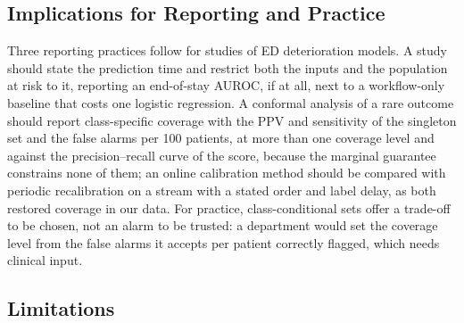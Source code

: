 \subsection{Implications for Reporting and Practice}

Three reporting practices follow for studies of ED deterioration models. A study should state the prediction time and restrict both the inputs and the population at risk to it, reporting an end-of-stay AUROC, if at all, next to a workflow-only baseline that costs one logistic regression. A conformal analysis of a rare outcome should report class-specific coverage with the PPV and sensitivity of the singleton set and the false alarms per 100 patients, at more than one coverage level and against the precision--recall curve of the score, because the marginal guarantee constrains none of them; an online calibration method should be compared with periodic recalibration on a stream with a stated order and label delay, as both restored coverage in our data. For practice, class-conditional sets offer a trade-off to be chosen, not an alarm to be trusted: a department would set the coverage level from the false alarms it accepts per patient correctly flagged, which needs clinical input.

\subsection{Limitations}
\label{sec:limitations}

